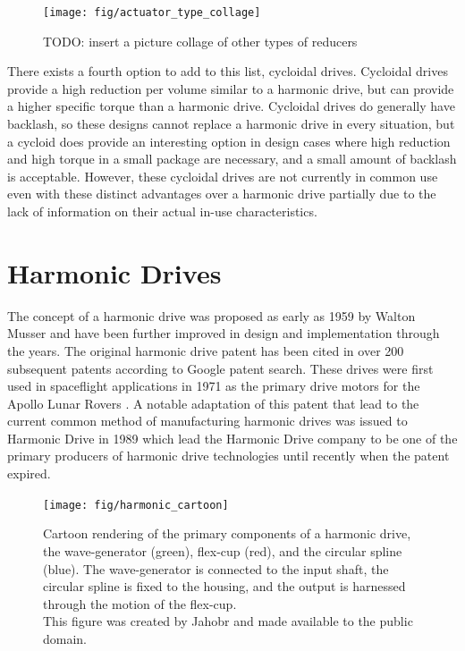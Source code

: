 \begin{figure}[h]
   \centering
   \texttt{[image: fig/actuator\_type\_collage]}
   \caption{TODO: insert a picture collage of other types of reducers}
   \label{fig:reducer_collage}
\end{figure}

There exists a fourth option to add to this list, cycloidal drives. 
Cycloidal drives provide a high reduction per volume similar to a harmonic drive, but can provide a higher specific torque than a harmonic drive. 
Cycloidal drives do generally have backlash, so these designs cannot replace a harmonic drive in every situation, but a cycloid does provide an interesting option in design cases where high reduction and high torque in a small package are necessary, and a small amount of backlash is acceptable. 
However, these cycloidal drives are not currently in common use even with these distinct advantages over a harmonic drive partially due to the lack of information on their actual in-use characteristics. 

\section{Harmonic Drives} \label{intro:harmonic}

The concept of a harmonic drive was proposed as early as 1959 by Walton Musser \cite{ref:harmonic_original} and have been further improved in design and implementation through the years. The original harmonic drive patent has been cited in over 200 subsequent patents according to Google patent search. These drives were first used in spaceflight applications in 1971 as the primary drive motors for the Apollo Lunar Rovers \cite{ref:harmonic_apollo}. A notable adaptation of this patent that lead to the current common method of manufacturing harmonic drives was issued to Harmonic Drive in 1989 \cite{ref:harmonic_drive_co} which lead the Harmonic Drive company to be one of the primary producers of harmonic drive technologies until recently when the patent expired. 

\begin{figure}[h]
   \centering
   \texttt{[image: fig/harmonic\_cartoon]}
   \caption{Cartoon rendering of the primary components of a harmonic drive, the wave-generator (green), flex-cup (red), and the circular spline (blue). The wave-generator is connected to the input shaft, the circular spline is fixed to the housing, and the output is harnessed through the motion of the flex-cup. \\
   This figure was created by Jahobr and made available to the public domain.}
   \label{fig:harmonic_cartoon}
\end{figure}

